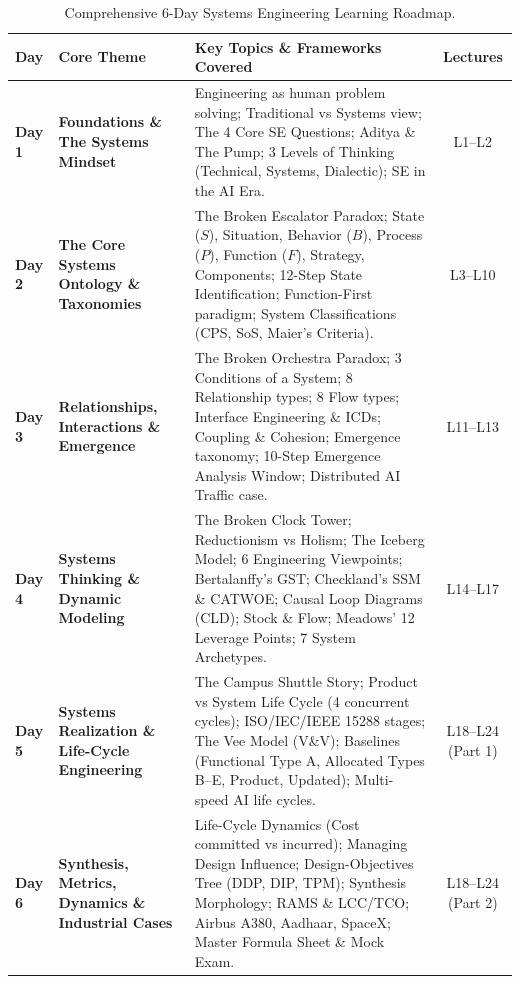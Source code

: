 \vspace{1em}
\begin{table}[htbp]
\centering
\small
\renewcommand{\arraystretch}{1.3}
\begin{tabularx}{\textwidth}{l p{3.5cm} X c}
\toprule
\textbf{Day} & \textbf{Core Theme} & \textbf{Key Topics \& Frameworks Covered} & \textbf{Lectures} \\
\midrule
\textbf{Day 1} & \textbf{Foundations \& The Systems Mindset} & Engineering as human problem solving; Traditional vs Systems view; The 4 Core SE Questions; Aditya \& The Pump; 3 Levels of Thinking (Technical, Systems, Dialectic); SE in the AI Era. & L1--L2 \\
\addlinespace
\textbf{Day 2} & \textbf{The Core Systems Ontology \& Taxonomies} & The Broken Escalator Paradox; State ($S$), Situation, Behavior ($B$), Process ($P$), Function ($F$), Strategy, Components; 12-Step State Identification; Function-First paradigm; System Classifications (CPS, SoS, Maier's Criteria). & L3--L10 \\
\addlinespace
\textbf{Day 3} & \textbf{Relationships, Interactions \& Emergence} & The Broken Orchestra Paradox; 3 Conditions of a System; 8 Relationship types; 8 Flow types; Interface Engineering \& ICDs; Coupling \& Cohesion; Emergence taxonomy; 10-Step Emergence Analysis Window; Distributed AI Traffic case. & L11--L13 \\
\addlinespace
\textbf{Day 4} & \textbf{Systems Thinking \& Dynamic Modeling} & The Broken Clock Tower; Reductionism vs Holism; The Iceberg Model; 6 Engineering Viewpoints; Bertalanffy's GST; Checkland's SSM \& CATWOE; Causal Loop Diagrams (CLD); Stock \& Flow; Meadows' 12 Leverage Points; 7 System Archetypes. & L14--L17 \\
\addlinespace
\textbf{Day 5} & \textbf{Systems Realization \& Life-Cycle Engineering} & The Campus Shuttle Story; Product vs System Life Cycle (4 concurrent cycles); ISO/IEC/IEEE 15288 stages; The Vee Model (V\&V); Baselines (Functional Type A, Allocated Types B--E, Product, Updated); Multi-speed AI life cycles. & L18--L24 (Part 1) \\
\addlinespace
\textbf{Day 6} & \textbf{Synthesis, Metrics, Dynamics \& Industrial Cases} & Life-Cycle Dynamics (Cost committed vs incurred); Managing Design Influence; Design-Objectives Tree (DDP, DIP, TPM); Synthesis Morphology; RAMS \& LCC/TCO; Airbus A380, Aadhaar, SpaceX; Master Formula Sheet \& Mock Exam. & L18--L24 (Part 2) \\
\bottomrule
\end{tabularx}
\caption{Comprehensive 6-Day Systems Engineering Learning Roadmap.}
\end{table}

